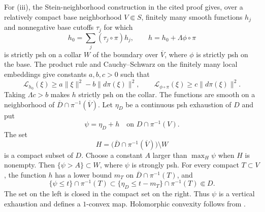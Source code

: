 \documentclass[11pt]{amsart}
\theoremstyle{definition}
\theoremstyle{remark}
\numberwithin{equation}{section}
\newcommand{\Levi}{\mathcal L}
\begin{document}
For \textup{(iii)}, the Stein-neighborhood construction in the cited
proof gives, over a relatively compact base neighborhood $V\Subset S$,
finitely many smooth functions $h_j$
and nonnegative base cutoffs $\tau_j$ for which
\[
 h_0=\sum_j(\tau_j\circ\pi)h_j,\qquad
 h=h_0+\Lambda\phi\circ\pi
\]
is strictly psh on a collar $W$ of the boundary over $\overline V$,
where $\phi$ is strictly psh on the base. The product rule and
Cauchy--Schwarz on the finitely many local embeddings give constants $a,b,c>0$ such that
\[
 \Levi_{h_0}(\xi)\ge a\|\xi\|^2-b\|d\pi(\xi)\|^2,
 \qquad
 \Levi_{\phi\circ\pi}(\xi)\ge c\|d\pi(\xi)\|^2.
\]
Taking $\Lambda c>b$ makes $h$ strictly psh on the collar.
The functions are smooth on a neighborhood of
$\overline D\cap\pi^{-1}(\overline V)$. Let $\eta_D$ be a continuous
psh exhaustion of $D$ and put
\[
 \psi=\eta_D+h\quad\text{on }D\cap\pi^{-1}(V).
\]
The set
\[
 H=\bigl(\overline D\cap\pi^{-1}(\overline V)\bigr)\setminus W
\]
is a compact subset of $D$. Choose a constant $A$ larger than
$\max_H\psi$ when $H$ is nonempty. Then $\{\psi>A\}\subset W$,
where $\psi$ is strongly psh. For every compact $T\subset V$, the
function $h$ has a lower bound $m_T$ on
$\overline D\cap\pi^{-1}(T)$, and
\[
 \{\psi\le t\}\cap\pi^{-1}(T)
 \subset\{\eta_D\le t-m_T\}\cap\pi^{-1}(T)\Subset D.
\]
The set on the left is closed in the compact set on the right.
Thus $\psi$ is a vertical exhaustion and defines a $1$-convex map.
Holomorphic convexity follows from
\cite[Theorem~2.3 and Proposition~2.4]{VijituForum2022}.
\end{document}

